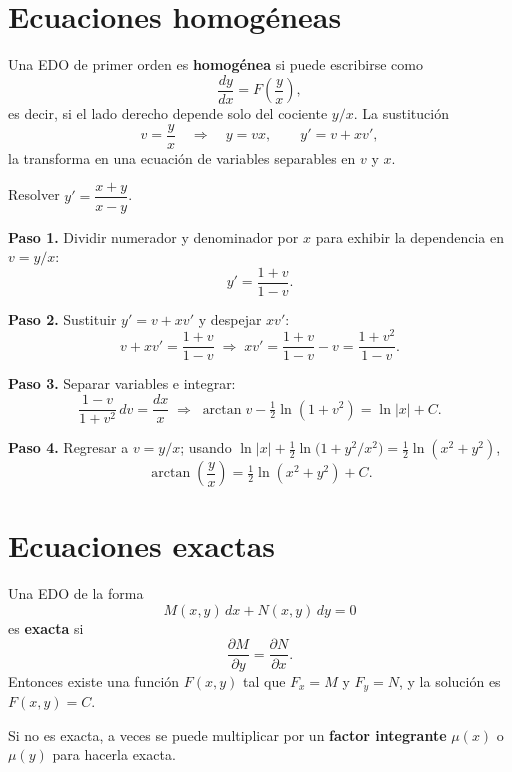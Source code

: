 \section{Ecuaciones homogéneas}

Una EDO de primer orden es \textbf{homogénea} si puede escribirse como
\[
\frac{dy}{dx}=F\!\left(\frac{y}{x}\right),
\]
es decir, si el lado derecho depende solo del cociente $y/x$. La sustitución
\[
v=\frac{y}{x}\quad\Longrightarrow\quad y=vx,\qquad y'=v+xv',
\]
la transforma en una ecuación de variables separables en $v$ y $x$.

\begin{example}
Resolver $y'=\dfrac{x+y}{x-y}$.

\begin{myproof}
\textbf{Paso 1.} Dividir numerador y denominador por $x$ para exhibir la dependencia en $v=y/x$:
\[
y'=\frac{1+v}{1-v}.
\]

\textbf{Paso 2.} Sustituir $y'=v+xv'$ y despejar $xv'$:
\[
v+xv'=\frac{1+v}{1-v}\;\Longrightarrow\; xv'=\frac{1+v}{1-v}-v=\frac{1+v^2}{1-v}.
\]

\textbf{Paso 3.} Separar variables e integrar:
\[
\frac{1-v}{1+v^2}\,dv=\frac{dx}{x}\;\Longrightarrow\;\arctan v-\tfrac{1}{2}\ln(1+v^2)=\ln|x|+C.
\]

\textbf{Paso 4.} Regresar a $v=y/x$; usando $\ln|x|+\tfrac{1}{2}\ln\!\big(1+y^2/x^2\big)=\tfrac{1}{2}\ln(x^2+y^2)$,
\[
\boxed{\arctan\!\left(\frac{y}{x}\right)=\tfrac{1}{2}\ln(x^2+y^2)+C}.
\]
\end{myproof}
\end{example}

\section{Ecuaciones exactas}

Una EDO de la forma
\[
M(x,y)\,dx + N(x,y)\,dy = 0
\]
es \textbf{exacta} si
\[
\frac{\partial M}{\partial y} = \frac{\partial N}{\partial x}.
\]
Entonces existe una función \(F(x,y)\) tal que \(F_x = M\) y \(F_y = N\), y la solución es \(F(x,y)=C\).

Si no es exacta, a veces se puede multiplicar por un \textbf{factor integrante} \(\mu(x)\) o \(\mu(y)\) para hacerla exacta.

